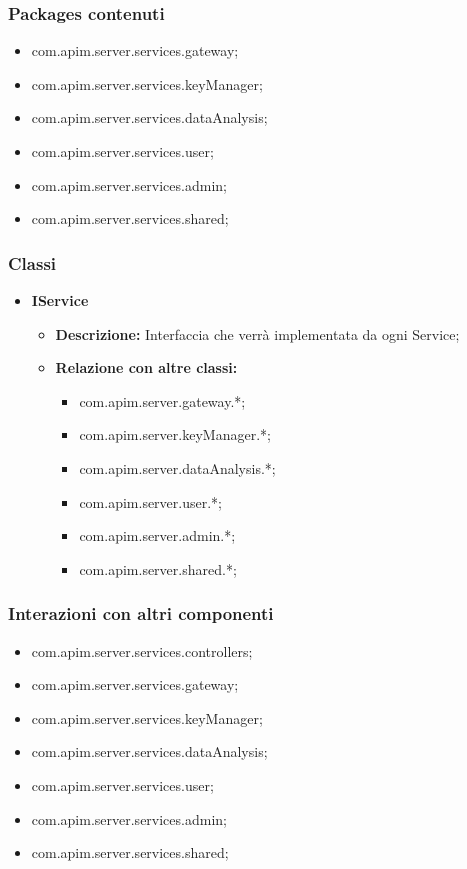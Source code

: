 {{     \subsubsection{Packages contenuti}
     \begin{itemize}
       \item com.apim.server.services.gateway;
       \item com.apim.server.services.keyManager;
       \item com.apim.server.services.dataAnalysis;
       \item com.apim.server.services.user;
       \item com.apim.server.services.admin;
       \item com.apim.server.services.shared;
     \end{itemize}
     \subsubsection{Classi}
     \begin{itemize} \itemsep1pt
       \item \textbf{IService}
       \begin{itemize}
         \item \textbf{Descrizione:} Interfaccia che verrà implementata da ogni Service;
         \item \textbf{Relazione con altre classi:}
         \begin{itemize}
           \item com.apim.server.gateway.*;
           \item com.apim.server.keyManager.*;
           \item com.apim.server.dataAnalysis.*;
           \item com.apim.server.user.*;
           \item com.apim.server.admin.*;
           \item com.apim.server.shared.*;
         \end{itemize}
       \end{itemize}
     \end{itemize}
     \subsubsection{Interazioni con altri componenti}
     \begin{itemize}
       \item com.apim.server.services.controllers;
       \item com.apim.server.services.gateway;
       \item com.apim.server.services.keyManager;
       \item com.apim.server.services.dataAnalysis;
       \item com.apim.server.services.user;
       \item com.apim.server.services.admin;
       \item com.apim.server.services.shared;
     \end{itemize}
}}
